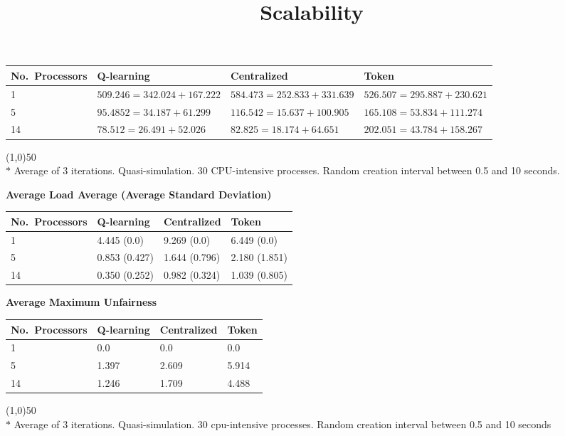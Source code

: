 \documentclass{slides}
\begin{document}
\landscape


\title{Scalability}
\begin{tabularx}{\linewidth}{|X|X|X|X|} \hline
	\textbf{No.\ Processors} & \textbf{Q-learning} & \textbf{Centralized} & \textbf{Token} \\ \hline
	1  & $509.246 = 342.024 + 167.222$ & $ 584.473 = 252.833 + 331.639$ 
		& $ 526.507 = 295.887 + 230.621 $ \\ \hline
	5  & $95.4852 = 34.187 + 61.299$ & $116.542 = 15.637 + 100.905$ &
		$165.108 = 53.834 + 111.274 $ \\ \hline
	14 & $78.512 = 26.491 + 52.026$ & $ 82.825 = 18.174 + 64.651$ & 
		$202.051 = 43.784 + 158.267$ \\ \hline
\end{tabularx}
\vspace{1em}
\line(1,0){50} \\
$*$ Average of 3 iterations.  Quasi-simulation.  30 CPU-intensive processes.
Random creation interval between 0.5 and 10 seconds.


\clearpage

\begin{center}
\textbf{Average Load Average (Average Standard Deviation)}
\end{center}
\begin{tabularx}{\linewidth}{|X|X|X|X|} \hline
	\textbf{No.\ Processors} & \textbf{Q-learning} & \textbf{Centralized} & \textbf{Token} \\ \hline
	1  & 4.445 (0.0) & 9.269 (0.0) & 6.449 (0.0)  \\ \hline
	5  & 0.853 (0.427) & 1.644 (0.796) & 2.180 (1.851) \\ \hline
	14 & 0.350 (0.252) & 0.982 (0.324) & 1.039 (0.805) \\ \hline
\end{tabularx}
\begin{center}
\textbf{Average Maximum Unfairness}
\end{center}
\begin{tabularx}{\linewidth}{|X|X|X|X|} \hline
	\textbf{No.\ Processors} & \textbf{Q-learning} & \textbf{Centralized} & \textbf{Token} \\ \hline
	1  & 0.0 & 0.0 & 0.0  \\ \hline
	5  & 1.397 & 2.609 & 5.914  \\ \hline
	14 & 1.246 & 1.709 & 4.488 \\ \hline
\end{tabularx}
\vspace{1em}
\line(1,0){50} \\
{$*$ Average of 3 iterations.  Quasi-simulation.  30 cpu-intensive
processes.  Random creation interval between 0.5 and 10 seconds}
\end{document}
